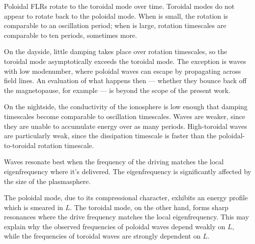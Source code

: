 

Poloidal FLRs rotate to the toroidal mode over time. Toroidal modes do not appear to rotate back to the poloidal mode. When \azm is small, the rotation is comparable to an oscillation period; when \azm is large, rotation timescales are comparable to ten periods, sometimes more.

On the dayside, little damping takes place over rotation timescales, so the toroidal mode asymptotically exceeds the toroidal mode. The exception is waves with low modenumber, where poloidal waves can escape by propagating across field lines. An evaluation of what happens then --- whether they bounce back off the magnetopause, for example --- is beyond the scope of the present work. 

On the nightside, the conductivity of the ionosphere is low enough that damping timescales become comparable to oscillation timescales. Waves are weaker, since they are unable to accumulate energy over as many periods. High-\azm toroidal waves are particularly weak, since the dissipation timescale is faster than the poloidal-to-toroidal rotation timescale. 

Waves resonate best when the frequency of the driving matches the local eigenfrequency where it's delivered. The eigenfrequency is significantly affected by the size of the plasmasphere. 



The poloidal mode, due to its compressional character, exhibits an energy profile which is smeared in $L$. The toroidal mode, on the other hand, forms sharp resonances where the drive frequency matches the local eigenfrequency. This may explain why the observed frequencies of poloidal waves depend weakly on $L$, while the frequencies of toroidal waves are strongly dependent on $L$. 


